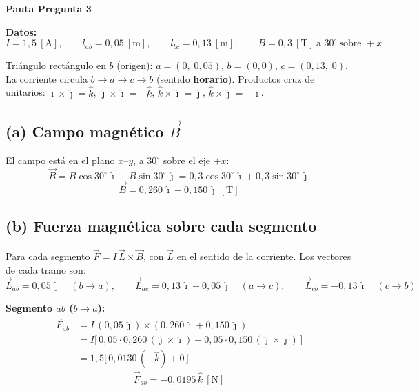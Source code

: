 \documentclass[12pt]{article}
\begin{document}
\begin{center}
    {\Large\textbf{Pauta Pregunta 3}}
\end{center}

\vspace{0.4cm}

\noindent\textbf{Datos:}
\[
    I = 1{,}5\ [\text{A}],\qquad
    l_{ab} = 0{,}05\ [\text{m}],\qquad
    l_{bc} = 0{,}13\ [\text{m}],\qquad
    B = 0{,}3\ [\text{T}]\ \text{a } 30^\circ\ \text{sobre } +x
\]

\noindent Tri\'angulo rect\'angulo en $b$ (origen): $a=(0,\;0{,}05)$, $b=(0,0)$,
$c=(0{,}13,\;0)$. La corriente circula $b\to a\to c\to b$ (sentido \textbf{horario}).
Productos cruz de unitarios: $\hat{\imath}\times\hat{\jmath}=\hat{k}$,\;
$\hat{\jmath}\times\hat{\imath}=-\hat{k}$,\;
$\hat{k}\times\hat{\imath}=\hat{\jmath}$,\;
$\hat{k}\times\hat{\jmath}=-\hat{\imath}$.

\subsection*{(a) Campo magn\'etico $\vec{B}$}

El campo est\'a en el plano $x$--$y$, a $30^\circ$ sobre el eje $+x$:
\[
    \vec{B} = B\cos30^\circ\,\hat{\imath} + B\sin30^\circ\,\hat{\jmath}
            = 0{,}3\cos30^\circ\,\hat{\imath} + 0{,}3\sin30^\circ\,\hat{\jmath}
\]
\[
    \boxed{\vec{B} = 0{,}260\,\hat{\imath} + 0{,}150\,\hat{\jmath}\ [\text{T}]}
\]

\subsection*{(b) Fuerza magn\'etica sobre cada segmento}

Para cada segmento $\vec{F} = I\,\vec{L}\times\vec{B}$, con $\vec{L}$ en el sentido de la
corriente. Los vectores de cada tramo son:
\[
    \vec{L}_{ab} = 0{,}05\,\hat{\jmath}
    \quad(b\to a),\qquad
    \vec{L}_{ac} = 0{,}13\,\hat{\imath} - 0{,}05\,\hat{\jmath}
    \quad(a\to c),\qquad
    \vec{L}_{cb} = -0{,}13\,\hat{\imath}
    \quad(c\to b)
\]

\noindent\textbf{Segmento $ab$ ($b\to a$):}
\begin{align*}
    \vec{F}_{ab} &= I\,(0{,}05\,\hat{\jmath})\times(0{,}260\,\hat{\imath}+0{,}150\,\hat{\jmath}) \\
                 &= I\big[\,0{,}05\cdot0{,}260\,(\hat{\jmath}\times\hat{\imath})
                    + 0{,}05\cdot0{,}150\,(\hat{\jmath}\times\hat{\jmath})\,\big] \\
                 &= 1{,}5\big[\,0{,}0130\,(-\hat{k}) + 0\,\big]
\end{align*}
\[
    \boxed{\vec{F}_{ab} = -0{,}0195\,\hat{k}\ [\text{N}]}
\]
\end{document}

